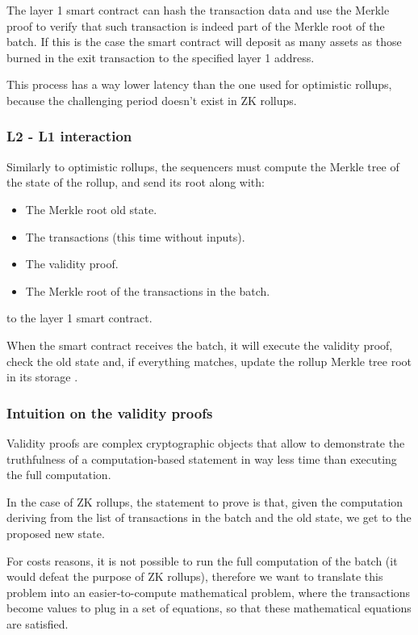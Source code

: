 \documentclass[11pt]{article}
\begin{document}
The layer 1 smart contract can hash the transaction data and use the Merkle proof to verify that such transaction is indeed part of the Merkle root of the batch. If this is the case the smart contract will deposit as many assets as those burned in the exit transaction to the specified layer 1 address.

This process has a way lower latency than the one used for optimistic rollups, because the challenging period doesn't exist in ZK rollups.

\subsubsection{L2 - L1 interaction} \label{subsubsection:zk_l2l1i}
Similarly to optimistic rollups, the sequencers must compute the Merkle tree of the state of the rollup, and send its root along with:
\begin{itemize}
    \item The Merkle root old state. 
    \item The transactions (this time without inputs).
    \item The validity proof. 
    \item The Merkle root of the transactions in the batch. 
\end{itemize} 

to the layer 1 smart contract.

When the smart contract receives the batch, it will execute the validity proof, check the old state and, if everything matches, update the rollup Merkle tree root in its storage \cite{zk_rollups}.

\subsubsection{Intuition on the validity proofs} \label{subsubsection:iotvp}
Validity proofs are complex cryptographic objects that allow to demonstrate the truthfulness of a computation-based statement in way less time than executing the full computation.

In the case of ZK rollups, the statement to prove is that, given the computation deriving from the list of transactions in the batch and the old state, we get to the proposed new state.

For costs reasons, it is not possible to run the full computation of the batch (it would defeat the purpose of ZK rollups), therefore we want to translate this problem into an easier-to-compute mathematical problem, where the transactions become values to plug in a set of equations, so that these mathematical equations are satisfied.
\end{document}
